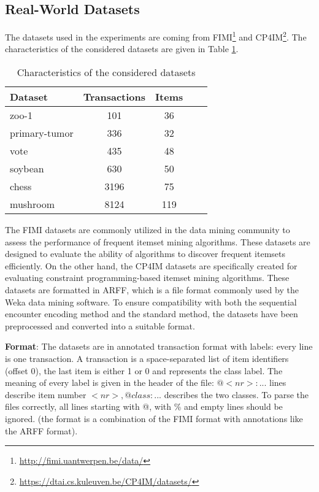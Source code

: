 \subsection{Real-World Datasets}
The datasets used in the experiments are coming from FIMI\footnote{\url{http://fimi.uantwerpen.be/data/}} and CP4IM\footnote{\url{https://dtai.cs.kuleuven.be/CP4IM/datasets/}}.
The characteristics of the considered datasets are given in Table \ref{tab:datasets}.
\begin{table}[H]
    \centering
    \caption{Characteristics of the considered datasets}
    \label{tab:datasets}
    \begin{tabular}{|l|c|c|c|c|}
        \hline
        Dataset       & Transactions & Items \\
        \hline
        zoo-1         & 101          & 36    \\
        primary-tumor & 336          & 32    \\
        vote          & 435          & 48    \\
        soybean       & 630          & 50    \\
        chess         & 3196         & 75    \\
        mushroom      & 8124         & 119   \\
        \hline
    \end{tabular}
\end{table}

The FIMI datasets are commonly utilized in the data mining community to assess the performance of frequent itemset mining algorithms.
These datasets are designed to evaluate the ability of algorithms to discover frequent itemsets efficiently.
On the other hand, the CP4IM datasets are specifically created for evaluating constraint programming-based itemset mining algorithms.
These datasets are formatted in ARFF, which is a file format commonly used by the Weka data mining software.
To ensure compatibility with both the sequential encounter encoding method and the standard method, the datasets have been preprocessed and converted into a suitable format.

\textbf{Format}: The datasets are in annotated transaction format with labels: every line is one transaction.
A transaction is a space-separated list of item identifiers (offset 0), the last item is either 1 or 0 and represents the class label.
The meaning of every label is given in the header of the file: $@<nr>: ...$ lines describe item number $<nr>, @class: ...$ describes the two classes.
To parse the files correctly, all lines starting with @, with \% and empty lines should be ignored. (the format is a combination of the FIMI format with annotations like the ARFF format).

